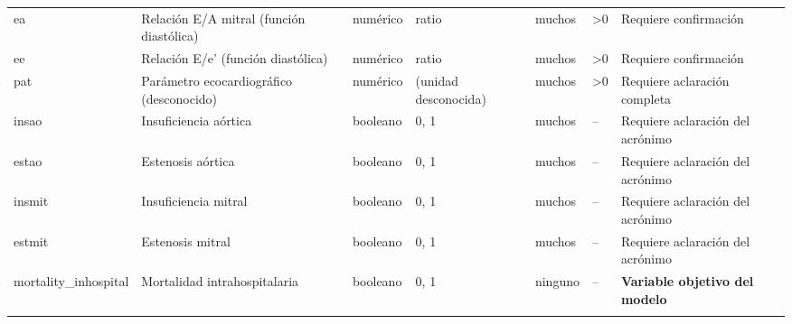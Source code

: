 \documentclass[11pt,a4paper]{article}
\renewcommand{\arraystretch}{1.2}
\begin{document}
\begin{longtable}{@{}L{0.095\textwidth} L{0.17\textwidth} L{0.07\textwidth} L{0.16\textwidth} L{0.14\textwidth} L{0.13\textwidth} L{0.15\textwidth}@{}}
ea & Relación E/A mitral (función diastólica) & numérico & ratio & muchos & >0 & Requiere confirmación \\
ee & Relación E/e' (función diastólica) & numérico & ratio & muchos & >0 & Requiere confirmación \\
pat & Parámetro ecocardiográfico (desconocido) & numérico & (unidad desconocida) & muchos & >0 & Requiere aclaración completa \\
insao & Insuficiencia aórtica & booleano & 0, 1 & muchos & -- & Requiere aclaración del acrónimo \\
estao & Estenosis aórtica & booleano & 0, 1 & muchos & -- & Requiere aclaración del acrónimo \\
insmit & Insuficiencia mitral & booleano & 0, 1 & muchos & -- & Requiere aclaración del acrónimo \\
estmit & Estenosis mitral & booleano & 0, 1 & muchos & -- & Requiere aclaración del acrónimo \\
mortality\_inhospital & Mortalidad intrahospitalaria & booleano & 0, 1 & ninguno & -- & \textbf{Variable objetivo del modelo} \\
\bottomrule
\endfoot

\end{longtable}
\renewcommand{\arraystretch}{1.2}
\normalsize
\end{document}
